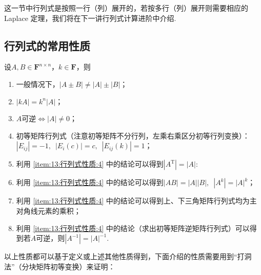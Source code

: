 这一节中行列式是按照一行（列）展开的，若按多行（列）展开则需要相应的 Laplace 定理，我们将在下一讲行列式计算进阶中介绍.

\subsection{行列式的常用性质}

设$A,B \in \mathbf{F}^{n \times n}$，$k \in \mathbf{F}$，则
\begin{enumerate}
    \item 一般情况下，$|A \pm B| \neq |A|\pm|B|$；

    \item $|kA|=k^n|A|$；

    \item $A$可逆$\iff |A| \neq 0$；

    \item \label{item:13:行列式性质:4}
          初等矩阵行列式（注意初等矩阵不分行列，左乘右乘区分初等行列变换）：\\
          $|E_{ij}|=-1,\enspace |E_i(c)|=c,\enspace |E_{ij}(k)|=1$；

    \item 利用 \ref*{item:13:行列式性质:4} 中的结论可以得到$|A^\mathrm{T}|=|A|$:

    \item 利用 \ref*{item:13:行列式性质:4} 中的结论可以得到$|AB|=|A||B|,\enspace|A^k|=|A|^k$；

    \item 利用 \ref*{item:13:行列式性质:4} 中的结论可以得到上、下三角矩阵行列式均为主对角线元素的乘积；

    \item 利用 \ref*{item:13:行列式性质:4} 中的结论（求出初等矩阵逆矩阵行列式）可以得到若$A$可逆，则$|A^{-1}|=|A|^{-1}$.
\end{enumerate}

以上性质都可以基于定义或上述其他性质得到，下面介绍的性质需要用到``打洞法''（分块矩阵初等变换）来证明：

